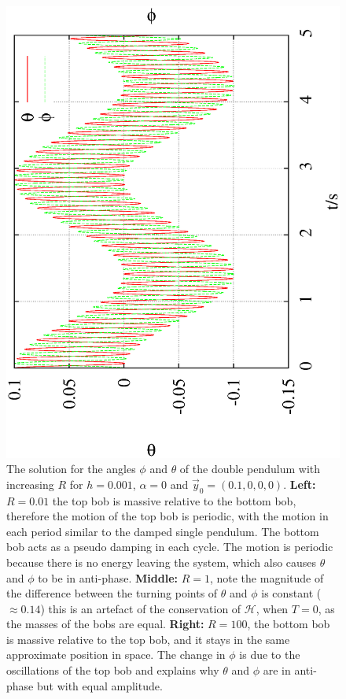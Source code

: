 \documentclass[10pt,a4paper]{article}
\begin{document}
\begin{figure}[h!]
\begin{center}
\includegraphics[scale = 0.2, angle =-90]{0.001_0_100_theta_phi.eps}
\caption{The solution for the angles $\phi$ and $\theta$ of the double pendulum with increasing $R$ for $h=0.001$,  $\alpha = 0$ and $\vec{y}_{0}=(0.1,0,0,0)$. \textbf{Left: }$R=0.01$ the top bob is massive relative to the bottom bob, therefore the motion of the top bob is periodic, with the motion in each period similar to the damped single pendulum. The bottom bob acts as a pseudo damping in each cycle. The motion is periodic because there is no energy leaving the system, which also causes $\theta$ and $\phi$ to be in anti-phase.  \textbf{Middle: }$R=1$, note the magnitude of the difference between the turning points of $\theta$ and $\phi$ is constant ($\approx 0.14$) this is an artefact of the conservation of $\mathcal{H}$, when $T = 0$, as the masses of the bobs are equal.  \textbf{Right: }$R=100$, the bottom bob is massive relative to the top bob, and it stays in the same approximate position in space. The change in $\phi$ is due to the oscillations of the top bob and explains why $\theta$ and $\phi$ are in anti-phase but with equal amplitude.}
\label{fig:GeneralMotionUndamped}
\end{center}
\end{figure}
\end{document}
